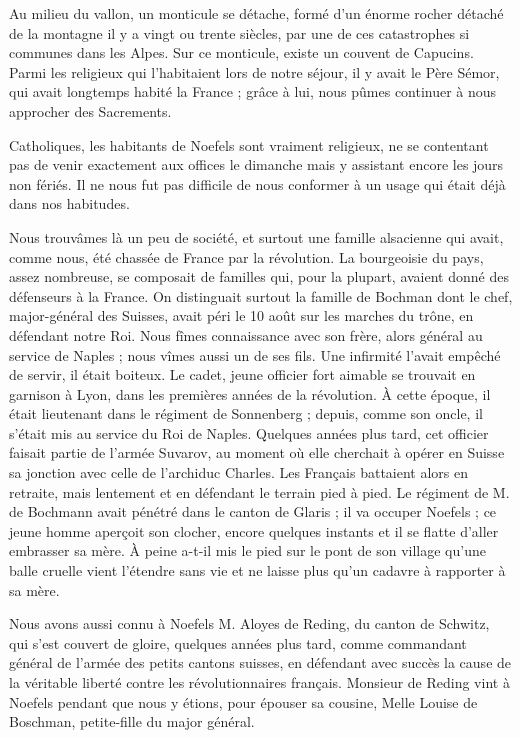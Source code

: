 \documentclass[11pt,a4paper]{report}
\begin{document}
Au milieu du vallon, un monticule se détache, formé d'un énorme rocher détaché de la montagne il y a vingt ou trente siècles, par une de ces catastrophes si communes dans les Alpes. Sur ce monticule, existe un couvent de Capucins. Parmi les religieux qui l'habitaient lors de notre séjour, il y avait le Père Sémor, qui avait longtemps habité la France ; grâce à lui, nous pûmes continuer à nous approcher des Sacrements.

Catholiques, les habitants de Noefels sont vraiment religieux, ne se contentant pas de venir exactement aux offices le dimanche mais y assistant encore les jours non fériés. Il ne nous fut pas difficile de nous conformer à un usage qui était déjà dans nos habitudes.

Nous trouvâmes là un peu de société, et surtout une famille alsacienne qui avait, comme nous, été chassée de France par la révolution. La bourgeoisie du pays, assez nombreuse, se composait de familles qui, pour la plupart, avaient donné des défenseurs à la France. On distinguait surtout la famille de Bochman dont le chef, major-général des Suisses, avait péri le 10 août sur les marches du trône, en défendant notre Roi. Nous fîmes connaissance avec son frère, alors général au service de Naples ; nous vîmes aussi un de ses fils. Une infirmité l'avait empêché de servir, il était boiteux. Le cadet, jeune officier fort aimable se trouvait en garnison à Lyon, dans les premières années de la révolution. À cette époque, il était lieutenant dans le régiment de Sonnenberg ; depuis, comme son oncle, il s'était mis au service du Roi de Naples. Quelques années plus tard, cet officier faisait partie de l'armée Suvarov, au moment où elle cherchait à opérer en Suisse sa jonction avec celle de l'archiduc Charles. Les Français battaient alors en retraite, mais lentement et en défendant le terrain pied à pied. Le régiment de M. de Bochmann avait pénétré dans le canton de Glaris ; il va occuper Noefels ; ce jeune homme aperçoit son clocher, encore quelques instants et il se flatte d'aller embrasser sa mère. À peine a-t-il mis le pied sur le pont de son village qu'une balle cruelle vient l'étendre sans vie et ne laisse plus qu'un cadavre à rapporter à sa mère.

Nous avons aussi connu à Noefels M. Aloyes de Reding, du canton de Schwitz, qui s'est couvert de gloire, quelques années plus tard, comme commandant général de l'armée des petits cantons suisses, en défendant avec succès la cause de la véritable liberté contre les révolutionnaires français. Monsieur de Reding vint à Noefels pendant que nous y étions, pour épouser sa cousine, Melle Louise de Boschman, petite-fille du major général.
\end{document}
